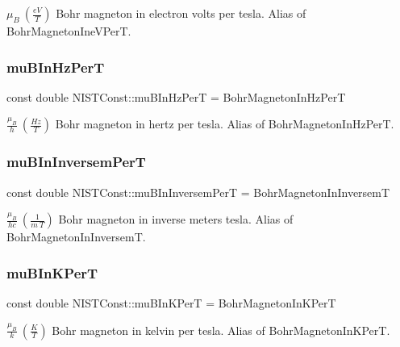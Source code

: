$\mu_B \ (\frac{eV}{T})$ Bohr magneton in electron volts per tesla. Alias of Bohr\+Magneton\+Ine\+V\+PerT. \mbox{\label{group___bohr_magneton_gac590bf03985de37cfaeea7982dac2aa8}} 
\subsubsection{\texorpdfstring{mu\+B\+In\+Hz\+PerT}{muBInHzPerT}}
{\footnotesize\ttfamily const double N\+I\+S\+T\+Const\+::mu\+B\+In\+Hz\+PerT = Bohr\+Magneton\+In\+Hz\+PerT}

$\frac{\mu_B}{h} \ (\frac{Hz}{T})$ Bohr magneton in hertz per tesla. Alias of Bohr\+Magneton\+In\+Hz\+PerT. \mbox{\label{group___bohr_magneton_ga4d426841ef01963272df91bd0534a966}} 
\subsubsection{\texorpdfstring{mu\+B\+In\+Inversem\+PerT}{muBInInversemPerT}}
{\footnotesize\ttfamily const double N\+I\+S\+T\+Const\+::mu\+B\+In\+Inversem\+PerT = Bohr\+Magneton\+In\+InversemT}

$\frac{\mu_B}{hc} \ (\frac{1}{m\ T})$ Bohr magneton in inverse meters tesla. Alias of Bohr\+Magneton\+In\+InversemT. \mbox{\label{group___bohr_magneton_ga51473ab154d1c4e8e9afca84952db156}} 
\subsubsection{\texorpdfstring{mu\+B\+In\+K\+PerT}{muBInKPerT}}
{\footnotesize\ttfamily const double N\+I\+S\+T\+Const\+::mu\+B\+In\+K\+PerT = Bohr\+Magneton\+In\+K\+PerT}

$\frac{\mu_B}{k} \ (\frac{K}{T})$ Bohr magneton in kelvin per tesla. Alias of Bohr\+Magneton\+In\+K\+PerT. 